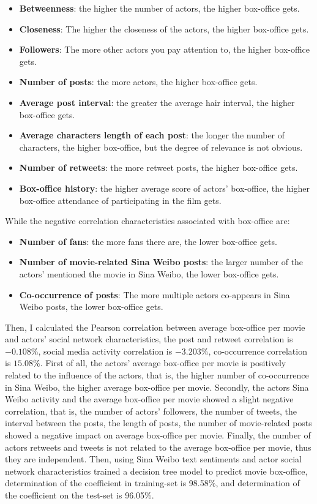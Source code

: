\documentclass[review]{cvpr}
\begin{document}
\begin{itemize}
\item {\bf Betweenness}: the higher the number of actors, the higher box-office gets.
\item {\bf Closeness}: The higher the closeness of the actors, the higher box-office gets.
\item {\bf Followers}: The more other actors you pay attention to, the higher box-office gets.
\item {\bf Number of posts}: the more actors, the higher box-office gets.
\item {\bf Average post interval}: the greater the average hair interval, the higher box-office gets.
\item {\bf Average characters length of each post}: the longer the number of characters, the higher box-office, but the degree of relevance is not obvious.
\item {\bf Number of retweets}: the more retweet posts, the higher box-office gets.
\item {\bf Box-office history}: the higher average score of actors' box-office, the higher box-office attendance of participating in the film gets.
\end{itemize}

While the negative correlation characteristics associated with box-office are:
\begin{itemize}
\item {\bf Number of fans}: the more fans there are, the lower box-office gets.
\item {\bf Number of movie-related Sina Weibo posts}: the larger number of the actors' mentioned the movie in Sina Weibo, the lower box-office gets.
\item {\bf Co-occurrence of posts}: The more multiple actors co-appears in Sina Weibo posts, the lower box-office gets.
\end{itemize}

\par Then, I calculated the Pearson correlation between average box-office per movie and actors' social network characteristics, the post and retweet correlation is $-0.108\%$, social media activity correlation is $-3.203\%$, co-occurrence correlation is $15.08\%$.
First of all, the actors' average box-office per movie is positively related to the influence of the actors, that is, the higher number of co-occurrence in Sina Weibo, the higher average box-office per movie.
Secondly, the actors Sina Weibo activity and the average box-office per movie showed a slight negative correlation, that is,
the number of actors' followers, the number of tweets, the interval between the posts, the length of posts, the number of movie-related posts showed a negative impact on average box-office per movie.
Finally, the number of actors retweets and tweets is not related to the average box-office per movie, thus they are independent.
Then, using Sina Weibo text sentiments and actor social network characteristics trained a decision tree model to predict movie box-office,
determination of the coefficient in training-set is 98.58\%, and determination of the coefficient on the test-set is 96.05\%.
\end{document}
